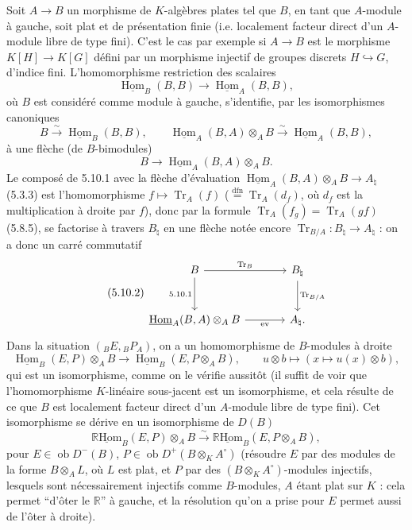 \documentclass[11pt]{article}
\DeclareMathOperator{\Hom}{Hom}
\newcommand{\R}{\mathbb{R}}\newcommand{\RHomCore}{\mathbb{R}\mathrm{Hom}}
\newcommand{\ob}{\operatorname{ob}}
\providecommand{\RHom}{\RHomCore}
\providecommand{\uRHom}{\underline{\RHom}}
\providecommand{\uHom}{\underline{\Hom}}
\providecommand{\Tr}{\operatorname{Tr}}
\providecommand{\Tr}{\operatorname{Tr}}
\providecommand{\Tr}{\operatorname{Tr}}
\providecommand{\RHom}{\RHomCore}
\providecommand{\Hom}{\operatorname{Hom}}
\providecommand{\ob}{\operatorname{ob}}
\providecommand{\RHom}{\R\mathcal{H}om}
\providecommand{\R}{\mathrm R}
\providecommand{\Tr}{\operatorname{Tr}}
\providecommand{\RHom}{\RHomCore}
\providecommand{\Hom}{\operatorname{Hom}}
\providecommand{\Tr}{\operatorname{Tr}}
\begin{document}
Soit $A\to B$ un morphisme de $K$-algèbres plates tel que $B$, en tant que $A$-module à gauche, soit plat et de présentation finie (i.e. localement facteur direct d'un $A$-module libre de type fini). C'est le cas par exemple si $A\to B$ est le morphisme $K[H]\to K[G]$ défini par un morphisme injectif de groupes discrets $H\hookrightarrow G$, d'indice fini. L'homomorphisme restriction des scalaires
\[
\uHom_B(B,B)\longrightarrow\uHom_A(B,B),
\]
où $B$ est considéré comme module à gauche, s'identifie, par les isomorphismes canoniques
\[
B\xrightarrow{\sim}\uHom_B(B,B),\qquad \uHom_A(B,A)\otimes_AB\xrightarrow{\sim}\uHom_A(B,B),
\]
à une flèche (de $B$-bimodules)
\begin{equation}\tag{5.10.1}
B\longrightarrow\uHom_A(B,A)\otimes_AB.
\end{equation}
Le composé de 5.10.1 avec la flèche d'évaluation $\uHom_A(B,A)\otimes_AB\to A_\natural$ (5.3.3) est l'homomorphisme $f\mapsto\Tr_A(f)$ ($\stackrel{\mathrm{dfn}}{=}\Tr_A(d_f)$, où $d_f$ est la multiplication à droite par $f$), donc par la formule $\Tr_A(f_g)=\Tr_A(gf)$ (5.8.5), se factorise à travers $B_\natural$ en une flèche notée encore $\Tr_{B/A}:B_\natural\to A_\natural$ : on a donc un carré commutatif
\begin{equation}\tag{5.10.2}
\begin{tikzcd}[column sep=large,row sep=large]
B \arrow[r,"\Tr_B"] \arrow[d,"5.10.1"'] & B_\natural \arrow[d,"\Tr_{B/A}"]\\
\uHom_A(B,A)\otimes_AB \arrow[r,"\mathrm{ev}"'] & A_\natural .
\end{tikzcd}
\end{equation}
Dans la situation $({}_BE,{}_BP_A)$, on a un homomorphisme de $B$-modules à droite
\begin{equation}\tag{5.10.3}
\uHom_B(E,P)\otimes_AB\longrightarrow\uHom_B(E,P\otimes_AB),\qquad
u\otimes b\longmapsto(x\longmapsto u(x)\otimes b),
\end{equation}
qui est un isomorphisme, comme on le vérifie aussitôt (il suffit de voir que l'homomorphisme $K$-linéaire sous-jacent est un isomorphisme, et cela résulte de ce que $B$ est localement facteur direct d'un $A$-module libre de type fini). Cet isomorphisme se dérive en un isomorphisme de $D(B)$
\begin{equation}\tag{5.10.4}
\uRHom_B(E,P)\otimes_AB\xrightarrow{\sim}\uRHom_B(E,P\otimes_AB),
\end{equation}
pour $E\in\ob D^-(B)$, $P\in\ob D^+(B\otimes_KA^\circ)$ (résoudre $E$ par des modules de la forme $B\otimes_AL$, où $L$ est plat, et $P$ par des $(B\otimes_KA^\circ)$-modules injectifs, lesquels sont nécessairement injectifs comme $B$-modules, $A$ étant plat sur $K$ : cela permet ``d'ôter le $\R$'' à gauche, et la résolution qu'on a prise pour $E$ permet aussi de l'ôter à droite).
\end{document}
